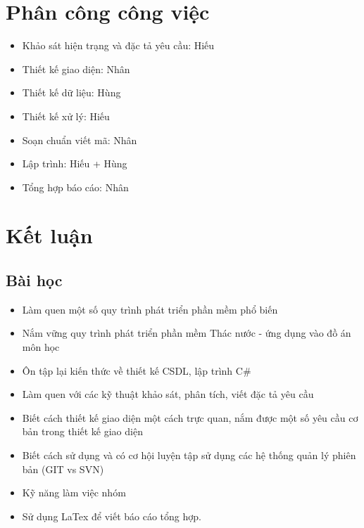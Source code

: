 \documentclass{article}
\begin{document}
	\section{Phân công công việc}
	
		\begin{itemize}
			\item Khảo sát hiện trạng và đặc tả yêu cầu: Hiếu
			\item Thiết kế giao diện: Nhân
			\item Thiết kế dữ liệu: Hùng
			\item Thiết kế xử lý: Hiếu
			\item Soạn chuẩn viết mã: Nhân
			\item Lập trình: Hiếu + Hùng
			\item Tổng hợp báo cáo: Nhân
			
		\end{itemize}
			
	\newpage			
	\section{Kết luận}
		
		\subsection{Bài học}
		
			\begin{itemize}
				\item Làm quen một số quy trình phát triển phần mềm phổ biến
				\item Nắm vững quy trình phát triển phần mềm Thác nước - ứng dụng vào đồ án môn học
				\item Ôn tập lại kiến thức về thiết kế CSDL, lập trình C\#
				\item Làm quen với các kỹ thuật khảo sát, phân tích, viết đặc tả yêu cầu
				\item Biết cách thiết kế giao diện một cách trực quan, nắm được một số yêu cầu cơ bản trong thiết kế giao diện
				\item Biết cách sử dụng và có cơ hội luyện tập sử dụng các hệ thống quản lý phiên bản (GIT vs SVN)
				\item Kỹ năng làm việc nhóm
				\item Sử dụng LaTex để viết báo cáo tổng hợp.
			\end{itemize}
		
\end{document}
